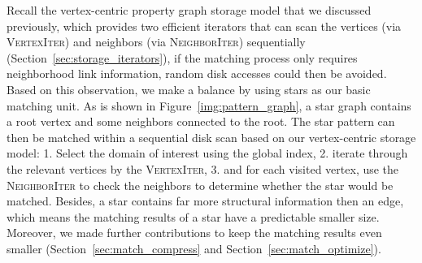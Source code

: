 Recall the vertex-centric property graph storage model that we discussed previously,
which provides two efficient iterators that can scan the vertices (via \textsc{VertexIter}) and neighbors (via \textsc{NeighborIter}) sequentially (Section~\ref{sec:storage_iterators}),
if the matching process only requires neighborhood link information,
random disk accesses could then be avoided.
Based on this observation, we make a balance by using stars as our basic matching unit.
As is shown in Figure~\ref{img:pattern_graph}, a star graph contains a root vertex and some neighbors connected to the root.
The star pattern can then be matched within a sequential disk scan based on our vertex-centric storage model:
1\@. Select the domain of interest using the global index,
2\@. iterate through the relevant vertices by the \textsc{VertexIter},
3\@. and for each visited vertex, use the \textsc{NeighborIter} to check the neighbors to determine whether the star would be matched.
Besides, a star contains far more structural information then an edge,
which means the matching results of a star have a predictable smaller size.
Moreover, we made further contributions to keep the matching results even smaller (Section~\ref{sec:match_compress} and Section~\ref{sec:match_optimize}).

